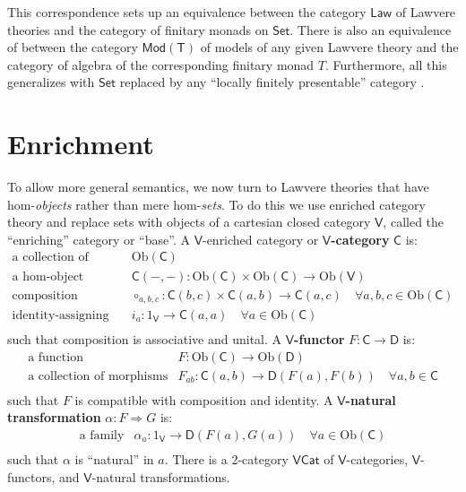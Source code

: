 \documentclass{amsart}
\theoremstyle{definition}
\newcommand{\Set}{\mathsf{Set}}
\newcommand{\Cat}{\mathsf{Cat}}
\newcommand{\Law}{\mathsf{Law}}
\newcommand{\Mod}{\mathsf{Mod}}
\newcommand{\V}{\mathsf{V}}
\newcommand{\D}{\mathsf{D}}
\newcommand{\C}{\mathsf{C}}
\newcommand{\T}{\mathsf{T}}
\newcommand{\Obj}{\mathrm{Ob}}
\newcommand{\maps}{\colon}
\begin{document}
This correspondence sets up an equivalence between the category $\Law$ of Lawvere theories and the category of finitary monads on $\Set$.  There is also an equivalence of between the category $\Mod(\T)$ of models of any given Lawvere theory and the category of algebra of the corresponding finitary monad $T$.  Furthermore, all this generalizes with $\Set$ replaced by any ``locally finitely presentable'' category \cite{adamekrosicky}.   

\section{Enrichment}
\label{sec:enrichment}

To allow more general semantics, we now turn to Lawvere theories that have hom-\emph{objects} rather than mere hom-\emph{sets}.  To do this we use enriched category theory \cite{kelly} and replace sets with objects of a cartesian closed category $\V$, called the ``enriching'' category or ``base''.    A $\V$-enriched category or \textbf{$\V$-category} $\C$ is:
\[\begin{array}{rl}
\text{a collection of objects} & \Obj(\C)\\
\text{a hom-object function} & \C(-,-)\maps \Obj(\C) \times \Obj(\C) \to \Obj(\V)\\
\text{composition morphisms} & \circ_{a,b,c}\maps\C(b,c) \times \C(a,b) \to \C(a,c) \quad \forall a,b,c \in \Obj(\C)\\
\text{identity-assigning morphisms} & i_a\maps 1_\V \to\C(a,a) \quad \forall a \in \Obj(\C)\\
\end{array}\]
such that composition is associative and unital.  A \textbf{$\V$-functor} $F \maps \C \to \D$ is:
\[\begin{array}{rl}
\text{a function} & F\maps \Obj(\C) \to \Obj(\D)\\
\text{a collection of morphisms} & F_{ab}\maps \C(a,b) \to \D(F(a),F(b)) \quad \forall a,b \in \C\\
\end{array}\]
such that $F$ is compatible with composition and identity.  A \textbf{$\V$-natural transformation} $\alpha\maps F \Rightarrow G$ is:
\[\begin{array}{rl}
\text{a family} & \alpha_a \maps 1_\V \to \D(F(a),G(a)) \quad \forall a \in \Obj(\C)\\
\end{array}\]
such that $\alpha$ is ``natural'' in $a$.   There is a 2-category \textbf{$\V\Cat$} of $\V$-categories, $\V$-functors, and $\V$-natural transformations. 
\end{document}

